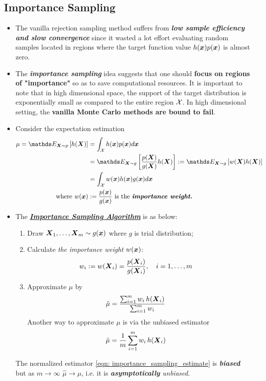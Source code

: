\documentclass[11pt]{article}
\begin{document}
\subsection{Importance Sampling}
\begin{itemize}
\item The vanilla rejection sampling method suffers from \emph{\textbf{low sample efficiency and slow convergence}} since it wasted a lot effort evaluating random samples located in regions where the target function value $h(\boldsymbol{x})p(\boldsymbol{x})$ is almost zero. 

\item The \emph{\textbf{importance sampling}} idea suggests that one should \textbf{focus on regions of "importance"} so as to save computational resources. It is important to note that in high dimensional space, the support of the target distribution is exponentially small as compared to the entire region ${\mathcal X}$. In high dimensional setting, the \textbf{vanilla Monte Carlo methods are bound to fail}.

\item Consider the expectation estimation
\begin{align}
\mu = \E{\mb{X}\sim p}{h(\mb{X})} &= \int_{\cX}h(\mb{x})p(\mb{x}) d\mb{x} \nonumber\\
&=\E{\mb{X}\sim g}{\frac{p(\mb{X})}{g(\mb{X})}h(\mb{X})} := \E{\mb{X}\sim g}{w(\mb{X})h(\mb{X})} \label{eqn: importance_sampling}\\
&= \int_{\cX} w(\mb{x})h(\mb{x})g(\mb{x}) d\mb{x} \nonumber\\
\text{where }w(\mb{x}) &:= \frac{p(\mb{x})}{g(\mb{x})} \text{ is the \emph{\textbf{importance weight.}}} \nonumber
\end{align}

\item The \underline{\emph{\textbf{Importance Sampling Algorithm}}} \citep{liu2001monte, robert1999monte} is as below:
\begin{enumerate}
\item Draw $\boldsymbol{X}_1, \ldots, \boldsymbol{X}_{m} \sim g(\boldsymbol{x})$ where $g$ is trial distribution;
\item Calculate \emph{the importance weight} $w(\boldsymbol{x})$: 
\begin{align*}
w_i := w(\boldsymbol{X}_i) &= \frac{p(\boldsymbol{X}_i)}{g(\boldsymbol{X}_i)}, \quad i=1,\ldots, m
\end{align*}
\item Approximate $\mu$ by 
\begin{align}
\hat{\mu} &= \frac{\sum_{i=1}^{m}w_i\,h(\boldsymbol{X}_i)}{\sum_{i=1}^{m}w_i} \label{eqn: importance_sampling_estimate}
\end{align}
Another way to approximate $\mu$ is via the unbiased estimator
\begin{align}
\hat{\mu} &= \frac{1}{m}\sum_{i=1}^{m}w_i\,h(\boldsymbol{X}_i) \label{eqn: importance_sampling_estimate2}
\end{align}
\end{enumerate} The normalized estimator \eqref{eqn: importance_sampling_estimate} is \textbf{\emph{biased}} but as $m\rightarrow \infty$ $\hat{\mu}\rightarrow \mu$, i.e. it is \emph{\textbf{asymptotically} unbiased}.


\end{itemize}
\end{document}
